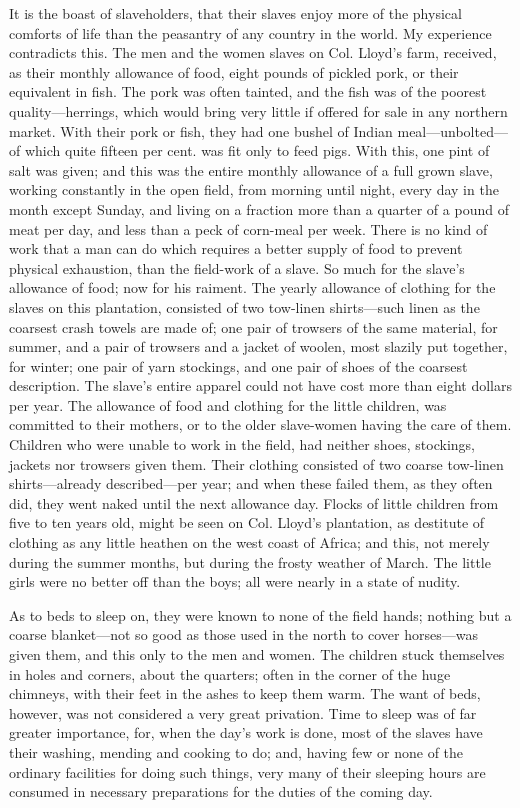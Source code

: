 It is the boast of slaveholders, that their slaves enjoy more of the
physical comforts of life than the peasantry of any country in the
world. My experience contradicts this. The men and the women slaves on
Col. Lloyd's farm, received, as their monthly allowance of food, eight
pounds of pickled pork, or their equivalent in fish. The pork was often
tainted, and the fish was of the poorest quality---herrings, which would
bring very little if offered for sale in any northern market. With their
pork or fish, they had one bushel of Indian meal---unbolted---of which
quite fifteen per cent. was fit only to feed pigs. With this, one pint
of salt was given; and this was the entire monthly allowance of a full
grown slave, working constantly in the open field, from morning until
night, every day in the month except Sunday, and living on a fraction
more than a quarter of a pound of meat per day, and less than a peck of
corn-meal per week. There is no kind of work that a man can do {}which
requires a better supply of food to prevent physical exhaustion, than
the field-work of a slave. So much for the slave's allowance of food;
now for his raiment. The yearly allowance of clothing for the slaves on
this plantation, consisted of two tow-linen shirts---such linen as the
coarsest crash towels are made of; one pair of trowsers of the same
material, for summer, and a pair of trowsers and a jacket of woolen,
most slazily put together, for winter; one pair of yarn stockings, and
one pair of shoes of the coarsest description. The slave's entire
apparel could not have cost more than eight dollars per year. The
allowance of food and clothing for the little children, was committed to
their mothers, or to the older slave-women having the care of them.
Children who were unable to work in the field, had neither shoes,
stockings, jackets nor trowsers given them. Their clothing consisted of
two coarse tow-linen shirts---already described---per year; and when
these failed them, as they often did, they went naked until the next
allowance day. Flocks of little children from five to ten years old,
might be seen on Col. Lloyd's plantation, as destitute of clothing as
any little heathen on the west coast of Africa; and this, not merely
during the summer months, but during the frosty weather of March. The
little girls were no better off than the boys; all were nearly in a
state of nudity.

As to beds to sleep on, they were known to none of the field hands;
nothing but a coarse blanket---not so good as those used in the north to
cover horses---was given them, and this only to the men and women. The
children stuck themselves in holes and corners, {}about the quarters;
often in the corner of the huge chimneys, with their feet in the ashes
to keep them warm. The want of beds, however, was not considered a very
great privation. Time to sleep was of far greater importance, for, when
the day's work is done, most of the slaves have their washing, mending
and cooking to do; and, having few or none of the ordinary facilities
for doing such things, very many of their sleeping hours are consumed in
necessary preparations for the duties of the coming day.

